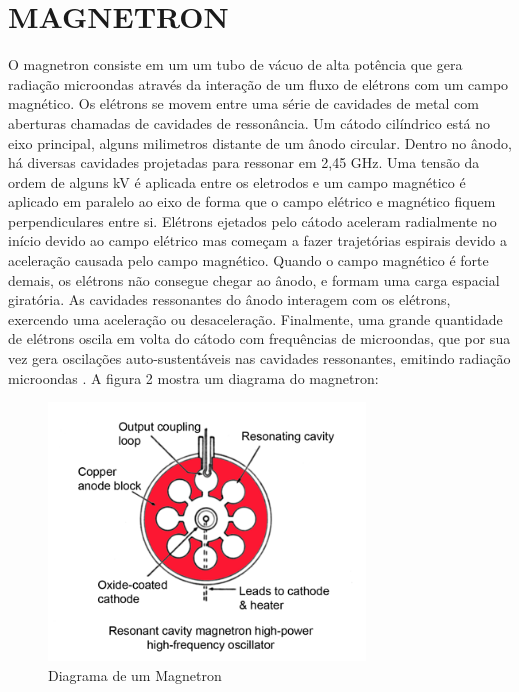 \section{MAGNETRON}
\label{sec:magnetron}

O magnetron consiste em um um tubo de vácuo de alta potência que gera radiação microondas através da interação de um fluxo de elétrons com um campo magnético. Os elétrons se movem entre uma série de cavidades de metal com aberturas chamadas de cavidades de ressonância. Um cátodo cilíndrico está no eixo principal, alguns milimetros distante de um ânodo circular. Dentro no ânodo, há diversas cavidades projetadas para ressonar em 2,45 GHz. Uma tensão da ordem de alguns kV é aplicada entre os eletrodos e um campo magnético é aplicado em paralelo ao eixo de forma que o campo elétrico e magnético fiquem perpendiculares entre si. Elétrons ejetados pelo cátodo aceleram radialmente no início devido ao campo elétrico mas começam a fazer trajetórias espirais devido a aceleração causada pelo campo magnético. Quando o campo magnético é forte demais, os elétrons não consegue chegar ao ânodo, e formam uma carga espacial giratória. As cavidades ressonantes do ânodo interagem com os elétrons, exercendo uma aceleração ou desaceleração. Finalmente, uma grande quantidade de elétrons oscila em volta do cátodo com frequências de microondas, que por sua vez gera oscilações auto-sustentáveis nas cavidades ressonantes, emitindo radiação microondas \cite{Vollmer}. A figura 2 mostra um diagrama do magnetron:

\begin{figure}[!htb]
    \centering
    \includegraphics[width=0.75\textwidth]{./dados/figuras/magnetron}
    \caption{Diagrama de um Magnetron}
    \label{fig:figura-magnetron}
\end{figure}


